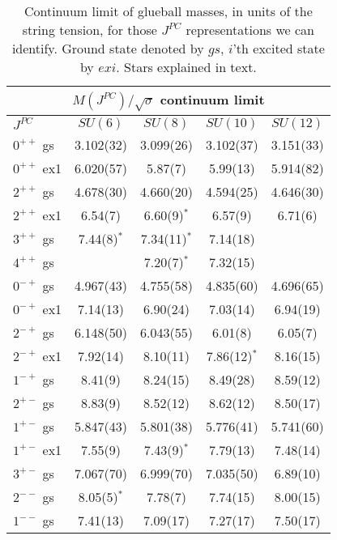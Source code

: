 \documentclass[12pt]{article}
\begin{document}
\begin{table}[htb]
\centering
\begin{tabular}{|l|c|c|c|c|} \hline
\multicolumn{5}{|c|}{$M(J^{PC})/\surd\sigma$ continuum limit} \\ \hline
  $J^{PC}$      & $SU(6)$ & $SU(8)$ & $SU(10)$ & $SU(12)$ \\ \hline
 $0^{++}$ {gs}   & 3.102(32)  & 3.099(26)  & 3.102(37)  & 3.151(33)  \\
 $0^{++}$ {ex1}  & 6.020(57)  & 5.87(7)    & 5.99(13)   & 5.914(82)  \\
 $2^{++}$ {gs}   & 4.678(30)  & 4.660(20)  & 4.594(25)  & 4.646(30)  \\
 $2^{++}$ {ex1}  & 6.54(7)    & 6.60(9)$^*$ & 6.57(9)   & 6.71(6)  \\
 $3^{++}$ {gs}   & 7.44(8)$^*$ & 7.34(11)$^*$ & 7.14(18) &   \\ 
 $4^{++}$ {gs}   &            & 7.20(7)$^*$ & 7.32(15)  &   \\ \hline
 $0^{-+}$ {gs}   & 4.967(43)  & 4.755(58)  & 4.835(60)  & 4.696(65)  \\ 
 $0^{-+}$ {ex1}  & 7.14(13)   & 6.90(24)   & 7.03(14)   & 6.94(19)  \\
 $2^{-+}$ {gs}   & 6.148(50)  & 6.043(55)  & 6.01(8)   &  6.05(7) \\
 $2^{-+}$ {ex1}  & 7.92(14)   & 8.10(11)   & 7.86(12)$^*$ & 8.16(15)  \\
 $1^{-+}$ {gs}   & 8.41(9)    & 8.24(15)   & 8.49(28)  & 8.59(12)  \\ \hline
 $2^{+-}$ {gs}   & 8.83(9)    & 8.52(12)   & 8.62(12)  & 8.50(17)    \\
 $1^{+-}$ {gs}   & 5.847(43)  & 5.801(38)  & 5.776(41) & 5.741(60)  \\
 $1^{+-}$ {ex1}  & 7.55(9)    & 7.43(9)$^*$ & 7.79(13) & 7.48(14)  \\
 $3^{+-}$ {gs}   & 7.067(70)  & 6.999(70)  & 7.035(50) & 6.89(10)  \\ \hline
 $2^{--}$ {gs}  & 8.05(5)$^*$ & 7.78(7)   & 7.74(15)  & 8.00(15)  \\
 $1^{--}$ {gs}   & 7.41(13)   & 7.09(17)   & 7.27(17)  & 7.50(17)  \\ \hline
\end{tabular}
\caption{Continuum limit of glueball masses, in units of the string tension,
  for those $J^{PC}$ representations we can identify. Ground state denoted by $gs$,
  $i$'th excited state by $exi$. Stars explained in text.}
\label{table_MKJ_N6-12}
\end{table}
\end{document}
